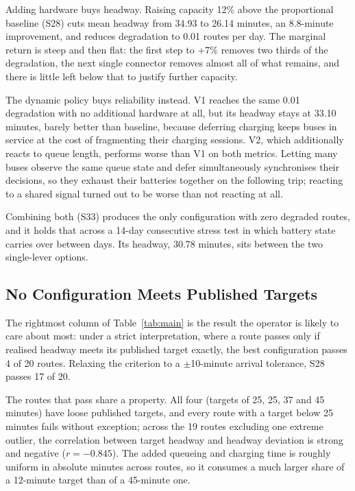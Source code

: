 \documentclass[conference]{IEEEtran}
\begin{document}
Adding hardware buys headway. Raising capacity 12\% above the
proportional baseline (S28) cuts mean headway from 34.93 to 26.14
minutes, an 8.8-minute improvement, and reduces degradation to 0.01
routes per day. The marginal return is steep and then flat: the first
step to +7\% removes two thirds of the degradation, the next single
connector removes almost all of what remains, and there is little left
below that to justify further capacity.

The dynamic policy buys reliability instead. V1 reaches the same 0.01
degradation with no additional hardware at all, but its headway stays at
33.10 minutes, barely better than baseline, because deferring charging
keeps buses in service at the cost of fragmenting their charging sessions.
V2, which additionally reacts to queue length, performs worse than V1 on
both metrics. Letting many buses observe the same queue state and defer
simultaneously synchronises their decisions, so they exhaust their
batteries together on the following trip; reacting to a shared signal
turned out to be worse than not reacting at all.

Combining both (S33) produces the only configuration with zero degraded
routes, and it holds that across a 14-day consecutive stress test in
which battery state carries over between days. Its headway, 30.78
minutes, sits between the two single-lever options.

\subsection{No Configuration Meets Published Targets}

The rightmost column of Table~\ref{tab:main} is the result the operator
is likely to care about most: under a strict interpretation, where a
route passes only if realised headway meets its published target exactly,
the best configuration passes 4 of 20 routes. Relaxing the criterion to a
$\pm$10-minute arrival tolerance, S28 passes 17 of 20.

The routes that pass share a property. All four (targets of 25, 25, 37
and 45 minutes) have loose published targets, and every route with a
target below 25 minutes fails without exception; across the 19 routes
excluding one extreme outlier, the correlation between target headway and
headway deviation is strong and negative ($r=-0.845$). The added queueing
and charging time is roughly uniform in absolute minutes across routes,
so it consumes a much larger share of a 12-minute target than of a
45-minute one.
\end{document}
